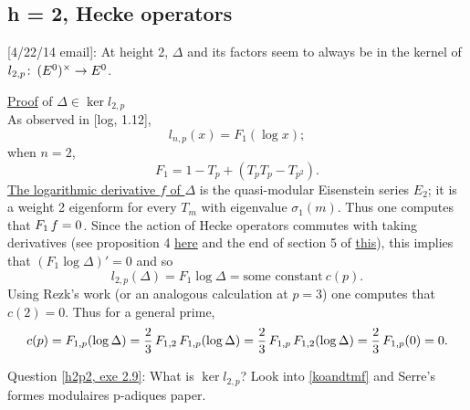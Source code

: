 \documentclass{rs}
\theoremstyle{definition}
\theoremstyle{remark}
\def\co{\colon\thinspace}
\numberwithin{equation}{section}
\numberwithin{thm}{section}
\begin{document}
\subsection{h = 2, Hecke operators}

[4/22/14 email]: At height 2, $\Delta$ and its factors seem to always be in the kernel of $l_{2,p} \co (E^0)^\times \to E^0$.  

\underline{Proof} of $\Delta \in \ker l_{2,p}$ \\
As observed in [log, 1.12], 
\[
 l_{n,p}(x) = F_1(\log x); 
\]
when $n = 2$, 
\[
 F_1 = 1 - T_p + (T_p T_p - T_{p^2}).  
\]
\href{http://galoisrepresentations.wordpress.com/2012/10/26/jacobi-by-pure-thought/}{The logarithmic derivative $f$ of $\Delta$} 
is the quasi-modular Eisenstein series $E_2$; 
it is a weight 2 eigenform for every $T_m$ with eigenvalue $\sigma_1(m)$.  
Thus one computes that $F_1 \thinspace f = 0$.  
Since the action of Hecke operators commutes with taking derivatives 
(see proposition 4 \href{http://arxiv.org/abs/math/0610861}{here} and the end of section 5 of \href{http://arxiv.org/abs/1205.2408}{this}), 
this implies that $(F_1 \log \Delta)' = 0$ and so 
\[
 l_{2,p}(\Delta) = F_1 \log \Delta = \text{some constant}~ c(p).  
\]
Using Rezk's work (or an analogous calculation at $p = 3$) one computes that $c(2) = 0$.  
Thus for a general prime, 
\[
 c(p) = F_{1,p}(\log \Delta) = \frac{2}{3} \thinspace F_{1,2} \thinspace F_{1,p}(\log \Delta) 
 = \frac{2}{3} \thinspace F_{1,p} \thinspace F_{1,2}(\log \Delta) 
 = \frac{2}{3} \thinspace F_{1,p}(0) = 0.  
\]

% 

Question \href{http://arxiv.org/abs/0812.1320}{[h2p2, exe 2.9]}: What is $\ker l_{2,p}$?  
Look into \href{http://www.math.uiuc.edu/~mando/papers/koandtmf.pdf}{[koandtmf]} and Serre's formes modulaires p-adiques paper.  \\%
\end{document}
